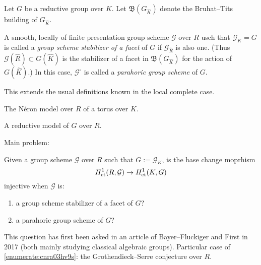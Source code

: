 \documentclass[reqno]{amsart} 
\numberwithin{theorem}{section}
\numberwithin{equation}{section}
\begin{document}
Let $G$ be a reductive group over $K$.  Let $\mathfrak{B}(G_{\hat{K}})$ denote the Bruhat--Tits building of $G_{\hat{K}}$.
\begin{definition}
  A smooth, locally of finite presentation group scheme $\mathcal{G}$ over $R$ usch that $\mathcal{G}_K = G$ is called a \emph{group scheme stabilizer of a facet} of $G$ if $\mathcal{G}_{\hat{R}}$ is also one.  (Thus $\mathcal{G}(\hat{R}) \subset G(\hat{K})$ is the stabilizer of a facet in $\mathfrak{B}(G_{\hat{K}})$ for the action of $G(\hat{K})$.)  In this case, $\mathcal{G}^{\circ}$ is called a \emph{parahoric group scheme} of $G$.
\end{definition}
This extends the usual definitions known in the local complete case.
\begin{example}
  The N{\'e}ron model over $R$ of a torus over $K$.
\end{example}
\begin{example}
  A reductive model of $G$ over $R$.
\end{example}

Main problem:
\begin{question}
  Given a group scheme $\mathcal{G}$ over $R$ such that $G := \mathcal{G}_K$, is the base change moprhism
  \begin{equation*}
    H^1_{\operatorname{et}}(R, \mathcal{G}) \rightarrow H^1_{\operatorname{et}}(K, G)
  \end{equation*}
  injective when $\mathcal{G}$ is:
  \begin{enumerate}
  \item\label{enumerate:cnra03idho} a group scheme stabilizer of a facet of $G$?
  \item\label{enumerate:cnra03hv9s} a parahoric group scheme of $G$?
  \end{enumerate}
\end{question}
This question has first been asked in an article of Bayer--Fluckiger and First in 2017 (both mainly studying classical algebraic groups).  Particular case of \eqref{enumerate:cnra03hv9s}: the Grothendieck--Serre conjecture over $R$.
\end{document}
